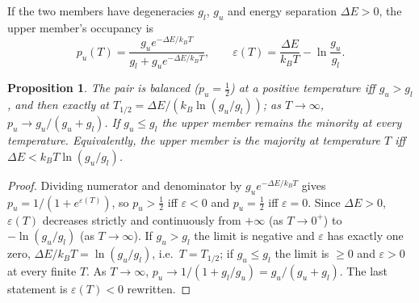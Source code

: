 \documentclass[11pt]{article}
\newtheorem{proposition}[theorem]{Proposition}
\theoremstyle{definition}\newtheorem{definition}[theorem]{Definition}
\theoremstyle{remark}\newtheorem{remark}[theorem]{Remark}
\begin{document}
If the two members have degeneracies $g_l$, $g_u$ and energy separation $\Delta E>0$, the upper member's occupancy is
\[
p_u(T)=\frac{g_ue^{-\Delta E/k_BT}}{g_l+g_ue^{-\Delta E/k_BT}},\qquad\varepsilon(T)=\frac{\Delta E}{k_BT}-\ln\frac{g_u}{g_l}.
\]
\begin{proposition}\label{prop:half}
The pair is balanced ($p_u=\frac12$) at a positive temperature iff $g_u>g_l$, and then exactly at $T_{1/2}=\Delta E/(k_B\ln(g_u/g_l))$; as $T\to\infty$, $p_u\to g_u/(g_u+g_l)$. If $g_u\le g_l$ the upper member remains the minority at every temperature. Equivalently, the upper member is the majority at temperature $T$ iff $\Delta E<k_BT\ln(g_u/g_l)$.
\end{proposition}
\begin{proof}
Dividing numerator and denominator by $g_ue^{-\Delta E/k_BT}$ gives $p_u=1/(1+e^{\varepsilon(T)})$, so $p_u>\frac12$ iff $\varepsilon<0$ and $p_u=\frac12$ iff $\varepsilon=0$. Since $\Delta E>0$, $\varepsilon(T)$ decreases strictly and continuously from $+\infty$ (as $T\to0^+$) to $-\ln(g_u/g_l)$ (as $T\to\infty$). If $g_u>g_l$ the limit is negative and $\varepsilon$ has exactly one zero, $\Delta E/k_BT=\ln(g_u/g_l)$, i.e.\ $T=T_{1/2}$; if $g_u\le g_l$ the limit is $\ge0$ and $\varepsilon>0$ at every finite $T$. As $T\to\infty$, $p_u\to1/(1+g_l/g_u)=g_u/(g_u+g_l)$. The last statement is $\varepsilon(T)<0$ rewritten.
\end{proof}
\end{document}
